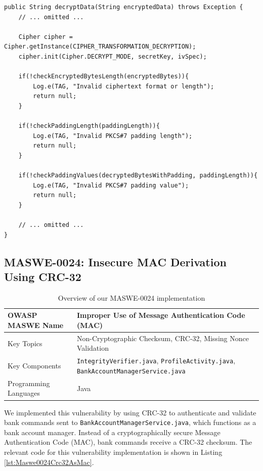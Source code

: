 \begin{lstlisting}[style=JavaStyle, float=tbh, captionpos=b, caption={Manual unpadding of PKCS\#7 with detailed error messages}, label={lst:Maswe0023ManualUnpadding}]
public String decryptData(String encryptedData) throws Exception {
    // ... omitted ...

    Cipher cipher = Cipher.getInstance(CIPHER_TRANSFORMATION_DECRYPTION);
    cipher.init(Cipher.DECRYPT_MODE, secretKey, ivSpec);

    if(!checkEncryptedBytesLength(encryptedBytes)){
        Log.e(TAG, "Invalid ciphertext format or length");
        return null;
    }

    if(!checkPaddingLength(paddingLength)){
        Log.e(TAG, "Invalid PKCS#7 padding length");
        return null;
    }

    if(!checkPaddingValues(decryptedBytesWithPadding, paddingLength)){
        Log.e(TAG, "Invalid PKCS#7 padding value");
        return null;
    }

    // ... omitted ...
}
\end{lstlisting}


\subsection{MASWE-0024: Insecure MAC Derivation Using CRC-32}
\label{subsec:maswe-0024}

\begin{table}[H]
    \centering
    \renewcommand{\arraystretch}{1.3}
        \begin{tabular}{p{5cm} p{8cm}} 
        \toprule
        OWASP MASWE Name & Improper Use of Message Authentication Code (MAC) \\ 
        \midrule
        Key Topics & Non-Cryptographic Checksum, CRC-32, Missing Nonce Validation \\
        Key Components & \texttt{IntegrityVerifier.java}, \texttt{ProfileActivity.java}, \texttt{BankAccountManagerService.java} \\
        Programming Languages & Java \\ 
        \bottomrule
        \end{tabular}
    \caption{Overview of our MASWE-0024 implementation}
    \label{tab:maswe-0024}
\end{table}

We implemented this vulnerability by using CRC-32 \cite{crc32} to authenticate and validate bank commands sent to \texttt{BankAccountManagerService.java}, which functions as a bank account manager. Instead of a cryptographically secure Message Authentication Code (MAC), bank commands receive a CRC-32 checksum. The relevant code for this vulnerability implementation is shown in Listing \ref{lst:Maswe0024Crc32AsMac}. 

